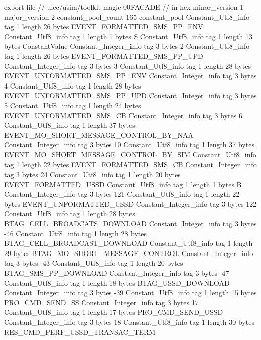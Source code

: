 export file {		// uicc/usim/toolkit
	magic	00FACADE		 // in hex
	minor_version	1
	major_version	2
	constant_pool_count	165
	constant_pool {
		Constant_Utf8_info {
			tag	1
			length	26
			bytes	EVENT_FORMATTED_SMS_PP_ENV
		}
		Constant_Utf8_info {
			tag	1
			length	1
			bytes	S
		}
		Constant_Utf8_info {
			tag	1
			length	13
			bytes	ConstantValue
		}
		Constant_Integer_info {
			tag	3
			bytes	2
		}
		Constant_Utf8_info {
			tag	1
			length	26
			bytes	EVENT_FORMATTED_SMS_PP_UPD
		}
		Constant_Integer_info {
			tag	3
			bytes	3
		}
		Constant_Utf8_info {
			tag	1
			length	28
			bytes	EVENT_UNFORMATTED_SMS_PP_ENV
		}
		Constant_Integer_info {
			tag	3
			bytes	4
		}
		Constant_Utf8_info {
			tag	1
			length	28
			bytes	EVENT_UNFORMATTED_SMS_PP_UPD
		}
		Constant_Integer_info {
			tag	3
			bytes	5
		}
		Constant_Utf8_info {
			tag	1
			length	24
			bytes	EVENT_UNFORMATTED_SMS_CB
		}
		Constant_Integer_info {
			tag	3
			bytes	6
		}
		Constant_Utf8_info {
			tag	1
			length	37
			bytes	EVENT_MO_SHORT_MESSAGE_CONTROL_BY_NAA
		}
		Constant_Integer_info {
			tag	3
			bytes	10
		}
		Constant_Utf8_info {
			tag	1
			length	37
			bytes	EVENT_MO_SHORT_MESSAGE_CONTROL_BY_SIM
		}
		Constant_Utf8_info {
			tag	1
			length	22
			bytes	EVENT_FORMATTED_SMS_CB
		}
		Constant_Integer_info {
			tag	3
			bytes	24
		}
		Constant_Utf8_info {
			tag	1
			length	20
			bytes	EVENT_FORMATTED_USSD
		}
		Constant_Utf8_info {
			tag	1
			length	1
			bytes	B
		}
		Constant_Integer_info {
			tag	3
			bytes	121
		}
		Constant_Utf8_info {
			tag	1
			length	22
			bytes	EVENT_UNFORMATTED_USSD
		}
		Constant_Integer_info {
			tag	3
			bytes	122
		}
		Constant_Utf8_info {
			tag	1
			length	28
			bytes	BTAG_CELL_BROADCATS_DOWNLOAD
		}
		Constant_Integer_info {
			tag	3
			bytes	-46
		}
		Constant_Utf8_info {
			tag	1
			length	28
			bytes	BTAG_CELL_BROADCAST_DOWNLOAD
		}
		Constant_Utf8_info {
			tag	1
			length	29
			bytes	BTAG_MO_SHORT_MESSAGE_CONTROL
		}
		Constant_Integer_info {
			tag	3
			bytes	-43
		}
		Constant_Utf8_info {
			tag	1
			length	20
			bytes	BTAG_SMS_PP_DOWNLOAD
		}
		Constant_Integer_info {
			tag	3
			bytes	-47
		}
		Constant_Utf8_info {
			tag	1
			length	18
			bytes	BTAG_USSD_DOWNLOAD
		}
		Constant_Integer_info {
			tag	3
			bytes	-39
		}
		Constant_Utf8_info {
			tag	1
			length	15
			bytes	PRO_CMD_SEND_SS
		}
		Constant_Integer_info {
			tag	3
			bytes	17
		}
		Constant_Utf8_info {
			tag	1
			length	17
			bytes	PRO_CMD_SEND_USSD
		}
		Constant_Integer_info {
			tag	3
			bytes	18
		}
		Constant_Utf8_info {
			tag	1
			length	30
			bytes	RES_CMD_PERF_USSD_TRANSAC_TERM
}}}
